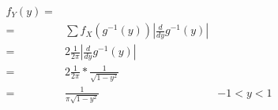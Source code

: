 \documentclass{article}
\begin{document}
    \begin{align}
      f_Y (y) =& &\\
              =& \sum f_X \left( g^{-1} (y) \right) \left| \frac{d}{dy} g^{-1} (y) \right| &\\
              =& 2\frac{1}{2\pi} \left| \frac{d}{dy} g^{-1} (y) \right| &\\
              =& 2\frac{1}{2\pi}*\frac{1}{\sqrt{1-y^2}} &\\
              =& \frac{1}{\pi\sqrt{1-y^2}} & -1<y<1
    \end{align}
  \nocite{prob2017}

  
  
\end{document}
